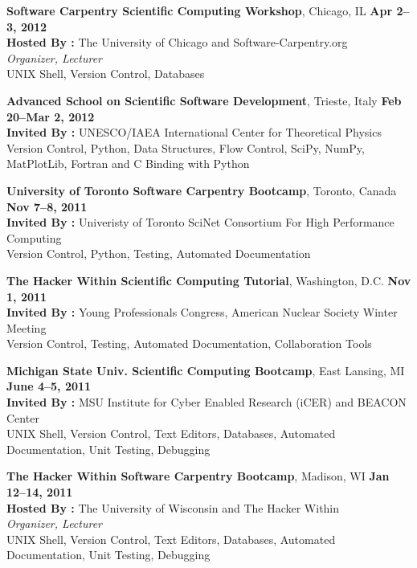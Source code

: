 \documentclass[margin,line]{resume}
\begin{document}
\begin{resume}
    \textbf{Software Carpentry Scientific Computing Workshop}, Chicago, IL \hfill \textbf{Apr 2--3, 2012}\\
               \textbf{Hosted By : } The University of Chicago and Software-Carpentry.org \\
               \textsl{Organizer, Lecturer}\\
               UNIX Shell, Version Control, Databases

    \textbf{Advanced School on Scientific Software Development}, Trieste, Italy \hfill \textbf{Feb 20--Mar 2, 2012}\\
               \textbf{Invited By : } UNESCO/IAEA International Center for Theoretical Physics\\
               Version Control, Python, Data Structures, Flow Control, SciPy, NumPy, MatPlotLib, Fortran and C Binding with Python

    \textbf{University of Toronto Software Carpentry Bootcamp}, Toronto, Canada \hfill \textbf{Nov 7--8, 2011}\\
               \textbf{Invited By : } Univeristy of Toronto SciNet Consortium For High Performance Computing\\
               Version Control, Python, Testing, Automated Documentation

    \textbf{The Hacker Within Scientific Computing Tutorial}, Washington, D.C.  \hfill \textbf{Nov 1, 2011}\\
               \textbf{Invited By : } Young Professionals Congress, American Nuclear Society Winter Meeting\\
               Version Control, Testing, Automated Documentation, Collaboration Tools

    \textbf{Michigan State Univ. Scientific Computing Bootcamp}, East Lansing, MI \hfill \textbf{June 4--5, 2011}\\
               \textbf{Invited By : } MSU Institute for Cyber Enabled Research (iCER) and BEACON Center\\
               UNIX Shell, Version Control, Text Editors, Databases, Automated Documentation, Unit Testing, Debugging

    \textbf{The Hacker Within Software Carpentry Bootcamp}, Madison, WI \hfill\textbf{Jan 12--14, 2011}\\
               \textbf{Hosted By : } The University of Wisconsin and The Hacker Within\\
               \textsl{Organizer, Lecturer}\\
               UNIX Shell, Version Control, Text Editors, Databases, Automated Documentation, Unit Testing, Debugging


\end{resume}
\end{document}
